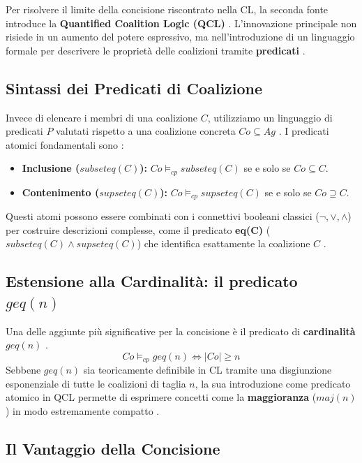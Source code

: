 \documentclass[12pt]{article}
\begin{document}
Per risolvere il limite della concisione riscontrato nella CL, la seconda fonte
introduce la \textbf{Quantified Coalition Logic (QCL)} . L'innovazione
principale non risiede in un aumento del potere espressivo, ma nell'introduzione
di un linguaggio formale per descrivere le proprietà delle coalizioni tramite
\textbf{predicati} .

\subsection{Sintassi dei Predicati di Coalizione}

Invece di elencare i membri di una coalizione $C$, utilizziamo un linguaggio di
predicati $P$ valutati rispetto a una coalizione concreta $Co \subseteq Ag$
. I predicati atomici fondamentali sono :
\begin{itemize}
	\item \textbf{Inclusione ($subseteq(C)$):} $Co \models_{cp} subseteq(C)$
	      se e solo se $Co \subseteq C$.
	\item \textbf{Contenimento ($supseteq(C)$):} $Co \models_{cp} supseteq(C)$
	      se e solo se $Co \supseteq C$.
\end{itemize}
Questi atomi possono essere combinati con i connettivi booleani classici
($\neg, \lor, \land$) per costruire descrizioni complesse, come il predicato
\textbf{eq(C)} ($subseteq(C) \land supseteq(C)$) che identifica esattamente
la coalizione $C$ .

\subsection{Estensione alla Cardinalità: il predicato $geq(n)$}

Una delle aggiunte più significative per la concisione è il predicato di
\textbf{cardinalità} $geq(n)$ .
\begin{equation}
	Co \models_{cp} geq(n) \iff |Co| \geq n
\end{equation}
Sebbene $geq(n)$ sia teoricamente definibile in CL tramite una disgiunzione
esponenziale di tutte le coalizioni di taglia $n$, la sua introduzione come
predicato atomico in QCL permette di esprimere concetti come la
\textbf{maggioranza} ($maj(n)$) in modo estremamente compatto .

\subsection{Il Vantaggio della Concisione}
\end{document}
